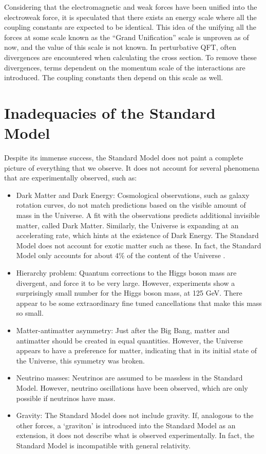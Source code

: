 \documentclass[11pt,a4paper,openright,twoside]{report}
\begin{document}
Considering that the electromagnetic and weak forces have been unified into the electroweak force, it is speculated that there exists an energy scale where all the coupling constants are expected to be identical. This idea of the unifying all the forces at some scale known as the ``Grand Unification'' scale is unproven as of now, and the value of this scale is not known. In perturbative QFT, often divergences are encountered when calculating the cross section. To remove these divergences, terms dependent on the momentum scale of the interactions are introduced. The coupling constants then depend on this scale as well.

\section{Inadequacies of the Standard Model}
Despite its immense success, the Standard Model does not paint a complete picture of everything that we observe. It does not account for several phenomena that are experimentally observed, such as:
\begin{itemize}
\item Dark Matter and Dark Energy: Cosmological observations, such as galaxy rotation curves, do not match predictions based on the visible amount of mass in the Universe. A fit with the observations predicts additional invisible matter, called Dark Matter\cite{DM_inc}. Similarly, the Universe is expanding at an accelerating rate, which hints at the existence of Dark Energy\cite{DE}. The Standard Model does not account for exotic matter such as these. In fact, the Standard Model only accounts for about 4\% of the content of the Universe \cite{Planck,DM_comp}.

\item Hierarchy problem\cite{hierarchy1,hierarchy2,hierarchy3,hierarchy4}: Quantum corrections to the Higgs boson mass are divergent, and force it to be very large. However, experiments show a surprisingly small number for the Higgs boson mass, at 125 GeV. There appear to be some extraordinary fine tuned cancellations that make this mass so small.

\item Matter-antimatter asymmetry: Just after the Big Bang, matter and antimatter should be created in equal quantities. However, the Universe appears to have a preference for matter, indicating that in its initial state of the Universe, this symmetry was broken\cite{Baryon_Asymmetry}.

\item Neutrino masses: Neutrinos are assumed to be massless in the Standard Model. However, neutrino oscillations have been observed\cite{neutrino2}, which are only possible if neutrinos have mass\cite{neutrino_mass}.

\item Gravity: The Standard Model does not include gravity. If, analogous to the other forces, a `graviton' is introduced into the Standard Model as an extension, it does not describe what is observed experimentally. In fact, the Standard Model is incompatible with general relativity\cite{grav_inc}.

\end{itemize}
\end{document}
